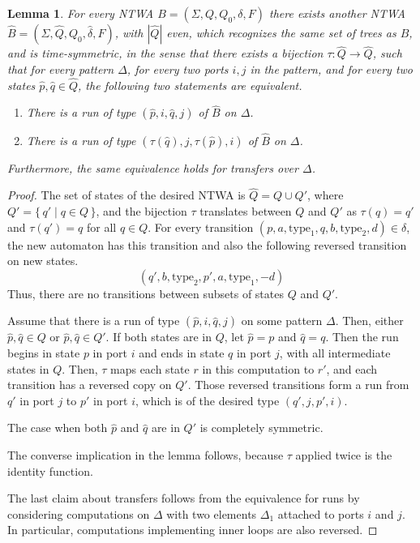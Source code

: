 \documentclass[12pt,a4paper]{article}
\newtheorem{lemma}{Lemma}
\theoremstyle{definition}
\newcommand{\set}[2]{\{ \, #1 \mid #2 \, \}}
\begin{document}
\begin{lemma}\label{symmetries_lemma}
For every NTWA $B=(\Sigma, Q, Q_0, \delta, F)$
there exists another NTWA $\widehat{B}=(\Sigma, \widehat{Q}, Q_0, \widehat{\delta}, F)$,
with $|\widehat{Q}|$ even,
which recognizes the same set of trees as $B$,
and is \emph{time-symmetric}, in the sense that
there exists a bijection $\tau \colon \widehat{Q} \to \widehat{Q}$,
such that for every pattern $\Delta$,
for every two ports $i, j$ in the pattern,
and for every two states $\widehat{p}, \widehat{q} \in \widehat{Q}$,
the following two statements are equivalent.
\begin{enumerate}
\item
	There is a run
	of type $(\widehat{p}, i, \widehat{q}, j)$ of $\widehat{B}$ on $\Delta$.
\item
	There is a run
	of type $(\tau(\widehat{q}), j, \tau(\widehat{p}), i)$ of $\widehat{B}$ on $\Delta$.
\end{enumerate}
Furthermore, the same equivalence holds for transfers over $\Delta$.
\end{lemma}
\begin{proof}
The set of states of the desired NTWA is $\widehat{Q}=Q \cup Q'$,
where $Q'=\set{q'}{q \in Q}$,
and the bijection $\tau$ translates between $Q$ and $Q'$
as $\tau(q)=q'$ and $\tau(q')=q$ for all $q \in Q$.
For every transition 
	$(p, a, \mathrm{type}_1,
	q, b, \mathrm{type}_2,
	d) \in \delta$,
the new automaton has this transition and also the following reversed transition on new states.
\begin{equation*}
	(q', b, \mathrm{type}_2, p', a, \mathrm{type}_1, -d)
\end{equation*}
Thus, there are no transitions between subsets of states $Q$ and $Q'$.

Assume that there is a run of type $(\widehat{p}, i, \widehat{q}, j)$
on some pattern $\Delta$.
Then, either $\widehat{p},\widehat{q} \in Q$ or $\widehat{p},\widehat{q} \in Q'$.
If both states are in $Q$, let $\widehat{p}=p$ and $\widehat{q}=q$.
Then the run begins in state $p$ in port $i$
and ends in state $q$ in port $j$, with all intermediate states in $Q$.
Then, $\tau$ maps each state $r$ in this computation to $r'$,
and each transition has a reversed copy on $Q'$.
Those reversed transitions form a run from $q'$ in port $j$ to $p'$ in port $i$,
which is of the desired type $(q', j, p', i)$.

The case when both $\widehat{p}$ and $\widehat{q}$ are in $Q'$ is completely symmetric.

The converse implication in the lemma follows, because $\tau$ applied twice is the identity function.

The last claim about transfers follows from the equivalence for runs
by considering computations on $\Delta$ with two elements $\Delta_1$ attached to ports $i$ and $j$.
In particular, computations implementing inner loops are also reversed.
\end{proof}
\end{document}
